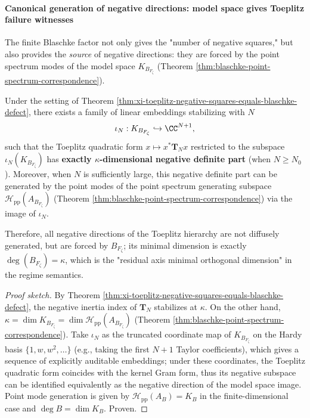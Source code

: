 \paragraph{Canonical generation of negative directions: model space gives Toeplitz failure witnesses}
The finite Blaschke factor not only gives the "number of negative squares," but also provides the \emph{source} of negative directions: they are forced by the point spectrum modes of the model space \(K_{B_{F_\zeta}}\) (Theorem \ref{thm:blaschke-point-spectrum-correspondence}).

\begin{theorem}\label{thm:xi-toeplitz-witness-generated-by-model-space}
Under the setting of Theorem \ref{thm:xi-toeplitz-negative-squares-equals-blaschke-defect}, there exists a family of linear embeddings stabilizing with \(N\)
\[
\iota_N:K_{B_{F_{\zeta}}}\hookrightarrow \CC^{N+1},
\]
such that the Toeplitz quadratic form \(x\mapsto x^\ast \mathbf{T}_N x\) restricted to the subspace \(\iota_N(K_{B_{F_{\zeta}}})\) has \textbf{exactly \(\kappa\)-dimensional negative definite part} (when \(N\ge N_0\)).
Moreover, when \(N\) is sufficiently large, this negative definite part can be generated by the point modes of the point spectrum generating subspace
\(\mathcal{H}_{\mathrm{pp}}(A_{B_{F_{\zeta}}})\)
(Theorem \ref{thm:blaschke-point-spectrum-correspondence}) via the image of \(\iota_N\).
\par
Therefore, all negative directions of the Toeplitz hierarchy are not diffusely generated, but are forced by \(B_{F_{\zeta}}\); its minimal dimension is exactly \(\deg(B_{F_{\zeta}})=\kappa\), which is the "residual axis minimal orthogonal dimension" in the regime semantics.
\end{theorem}

\begin{proof}[Proof sketch]
By Theorem \ref{thm:xi-toeplitz-negative-squares-equals-blaschke-defect}, the negative inertia index of \(\mathbf{T}_N\) stabilizes at \(\kappa\).
On the other hand, \(\kappa=\dim K_{B_{F_\zeta}}=\dim\mathcal H_{\mathrm{pp}}(A_{B_{F_\zeta}})\) (Theorem \ref{thm:blaschke-point-spectrum-correspondence}).
Take \(\iota_N\) as the truncated coordinate map of \(K_{B_{F_\zeta}}\) on the Hardy basis \(\{1,w,w^2,\dots\}\) (e.g., taking the first \(N{+}1\) Taylor coefficients), which gives a sequence of explicitly auditable embeddings; under these coordinates, the Toeplitz quadratic form coincides with the kernel Gram form, thus its negative subspace can be identified equivalently as the negative direction of the model space image.
Point mode generation is given by \(\mathcal H_{\mathrm{pp}}(A_B)=K_B\) in the finite-dimensional case and \(\deg B=\dim K_B\). Proven.
\end{proof}

